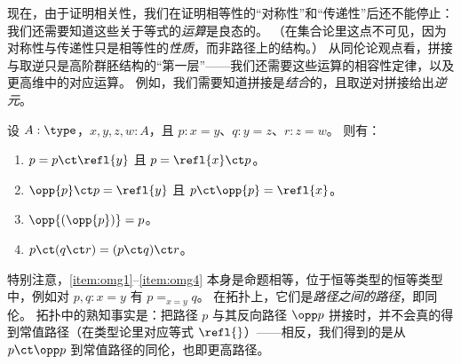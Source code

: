现在，由于证明相关性，我们在证明相等性的“对称性”和“传递性”后还不能停止：
我们还需要知道这些关于等式的\emph{运算}是良态的。
（在集合论里这点不可见，因为对称性与传递性只是相等性的\emph{性质}，而非路径上的结构。）
从同伦论观点看，拼接与取逆只是高阶群胚结构的“第一层”——我们还需要这些运算的相容性定律，以及更高维中的对应运算。
例如，我们需要知道拼接是\emph{结合}的，且取逆对拼接给出\emph{逆元}。

\begin{lem}\label{thm:omg}%
  设 $A:\type$，$x,y,z,w:A$，且 $p:x= y$、$q:y = z$、$r:z=w$。
  则有：
  \begin{enumerate}
  \item $p= p\ct \refl{y}$ 且 $p = \refl{x} \ct p$。\label{item:omg1}
  \item $\opp{p}\ct p=  \refl{y}$ 且 $p\ct \opp{p}= \refl{x}$。\label{item:omg2}
  \item $\opp{(\opp{p})}= p$。\label{item:omg3}
  \item $p\ct (q\ct r)=  (p\ct q)\ct r$。\label{item:omg4}
  \end{enumerate}
\end{lem}

特别注意，\ref{item:omg1}--\ref{item:omg4} 本身是命题相等，位于恒等类型的恒等类型中，例如对 $p,q:x=y$ 有 $p=_{x=y}q$。
在拓扑上，它们是\emph{路径之间的路径}，即同伦。
拓扑中的熟知事实是：把路径 $p$ 与其反向路径 $\opp p$ 拼接时，并不会真的得到常值路径（在类型论里对应等式 $\refl{}$）——相反，我们得到的是从 $p\ct\opp p$ 到常值路径的同伦，也即更高路径。

